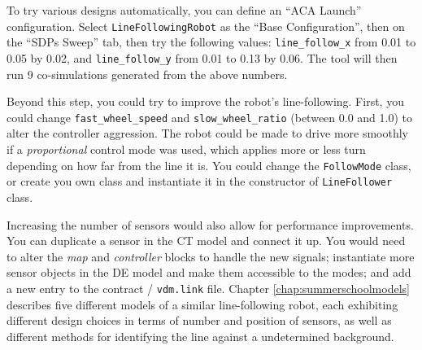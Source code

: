 To try various designs automatically, you can define an ``ACA Launch'' configuration. Select \texttt{LineFollowingRobot} as the ``Base Configuration'', then on the ``SDPs Sweep'' tab, then try the following values: \texttt{line\_follow\_x} from 0.01 to 0.05 by 0.02, and \texttt{line\_follow\_y} from 0.01 to 0.13 by 0.06. The \DESTECS tool will then run 9 co-simulations generated from the above numbers.

Beyond this step, you could try to improve the robot's line-following. First, you could change \texttt{fast\_wheel\_speed} and \texttt{slow\_wheel\_ratio} (between 0.0 and 1.0) to alter the controller aggression. The robot could be made to drive more smoothly if a \emph{proportional} control mode was used, which applies more or less turn depending on how far from the line it is. You could change the \texttt{FollowMode} class, or create you own class and instantiate it in the constructor of \texttt{LineFollower} class.

Increasing the number of sensors would also allow for performance improvements. You can duplicate a sensor in the CT model and connect it up. You would need to alter the \emph{map} and \emph{controller} blocks to handle the new signals; instantiate more sensor objects in the DE model and make them accessible to the modes; and add a new entry to the contract / \texttt{vdm.link} file. Chapter \ref{chap:summerschoolmodels} describes five
different models of a similar line-following robot, each exhibiting
different design choices in terms of number and position of sensors,
as well as different methods for identifying the line against a
undetermined background.
